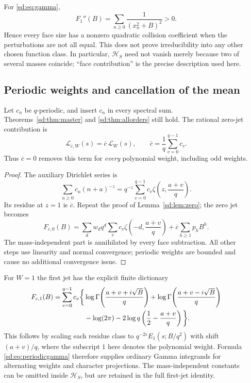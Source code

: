 For \eqref{sd:eq:gamma},
\[
 F_1''(B)=\sum_{n\ge0}\frac1{(x_n^2+B)^2}>0.
\]
Hence every face size has a nonzero quadratic collision coefficient
when the perturbations are not all equal.  This does not prove
irreducibility into any other chosen function class.  In particular,
$\mathcal H_S$ need not vanish merely because two of several masses
coincide; ``face contribution'' is the precise description used here.

\subsection{Periodic weights and cancellation of the mean}
\label{sd:subsec:periodic}

\begin{corollary}
\label{sd:cor:periodic}
Let $c_n$ be $q$-periodic, and insert $c_n$ in every spectral sum.
Theorems~\ref{sd:thm:master} and \ref{sd:thm:allorders} still hold.
The rational zero-jet contribution is
\begin{equation}\label{sd:eq:periodiclocal}
 \mathcal L_{c,W}(s)=\overline c\,\mathcal L_W(s),\qquad
                  \overline c=\frac1q\sum_{v=0}^{q-1}c_v.
\end{equation}
Thus $\overline c=0$ removes this term for \emph{every} polynomial
weight, including odd weights.
\end{corollary}
\begin{proof}
The auxiliary Dirichlet series is
\[
 \sum_{n\ge0}c_n(n+a)^{-z}
   =q^{-z}\sum_{v=0}^{q-1}c_v
                           \zeta\!\left(z,\frac{a+v}{q}\right).
\]
Its residue at $z=1$ is $\overline c$.  Repeat the proof of
Lemma~\ref{sd:lem:zero}; the zero jet becomes
\[
 F_{c,0}(B)=\sum_d w_dq^d
       \sum_v c_v\zeta\!\left(-d,\frac{a+v}{q}\right)
                    +\overline c\sum_{h\ge1}p_hB^h.
\]
The mass-independent part is annihilated by every face subtraction.
All other steps use linearity and normal convergence; periodic weights
are bounded and cause no additional convergence issue.
\end{proof}

For $W=1$ the first jet has the explicit finite dictionary
\begin{align}\label{sd:eq:periodicgamma}
 F_{c,1}(B)=\sum_{v=0}^{q-1}c_v\bigg\{&
 \log\Gamma\!\left(\frac{a+v+i\sqrt B}{q}\right)
 +\log\Gamma\!\left(\frac{a+v-i\sqrt B}{q}\right)\notag\\
 &-\log(2\pi)-2\log q
                         \left(\frac12-\frac{a+v}{q}\right)\bigg\}.
\end{align}
This follows by scaling each residue class to
$q^{-2s}E_1(s;B/q^2)$ with shift $(a+v)/q$, where the subscript
$1$ here denotes the polynomial weight.  Formula
\eqref{sd:eq:periodicgamma} therefore supplies ordinary Gamma
integrands for alternating weights and character projections.  The
mass-independent constants can be omitted inside $\mathcal H_S$,
but are retained in the full first-jet identity.

